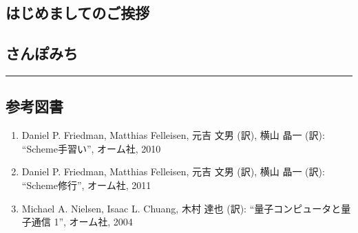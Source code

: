 \def\hline{\begin{center}\rule{.99\textwidth}{0.4pt}\end{center}}

\fontsize{10pt}{10pt}
\selectfont

\def\page#1#2{
\hline
\begin{minipage}{.01\hsize}
  ~
\end{minipage}
\begin{minipage}{.39\hsize}
#1
\end{minipage}
\begin{minipage}{.10\hsize}
  ~
\end{minipage}
\begin{minipage}{.39\hsize}
#2
\end{minipage}
}

\subsection*{はじめましてのご挨拶}


\subsection*{さんぽみち}


\hline

\subsection*{参考図書}
\begin{enumerate}
  \item
    Daniel P. Friedman, Matthias Felleisen, 元吉 文男 (訳), 横山 晶一 (訳):
    ``Scheme手習い'', オーム社, 2010
  \item
    Daniel P. Friedman, Matthias Felleisen, 元吉 文男 (訳), 横山 晶一 (訳):
    ``Scheme修行'', オーム社, 2011
  \item
    Michael A. Nielsen, Isaac L. Chuang, 木村 達也 (訳):
    ``量子コンピュータと量子通信 1'', オーム社, 2004
\end{enumerate}

